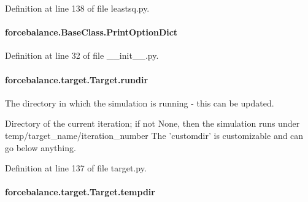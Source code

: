 Definition at line 138 of file leastsq.\-py.

\hypertarget{classforcebalance_1_1BaseClass_afc6659278497d7245bc492ecf405ccae}{
\paragraph[{Print\-Option\-Dict}]{\setlength{\rightskip}{0pt plus 5cm}forcebalance.\-Base\-Class.\-Print\-Option\-Dict\hspace{0.3cm}{\ttfamily [inherited]}}}\label{classforcebalance_1_1BaseClass_afc6659278497d7245bc492ecf405ccae}


Definition at line 32 of file \-\_\-\-\_\-init\-\_\-\-\_\-.\-py.

\hypertarget{classforcebalance_1_1target_1_1Target_a6872de5b2d4273b82336ea5b0da29c9e}{
\paragraph[{rundir}]{\setlength{\rightskip}{0pt plus 5cm}forcebalance.\-target.\-Target.\-rundir\hspace{0.3cm}{\ttfamily [inherited]}}}\label{classforcebalance_1_1target_1_1Target_a6872de5b2d4273b82336ea5b0da29c9e}


The directory in which the simulation is running -\/ this can be updated. 

Directory of the current iteration; if not None, then the simulation runs under temp/target\-\_\-name/iteration\-\_\-number The 'customdir' is customizable and can go below anything.

Definition at line 137 of file target.\-py.

\hypertarget{classforcebalance_1_1target_1_1Target_aa1f01b5b78db253b5b66384ed11ed193}{
\paragraph[{tempdir}]{\setlength{\rightskip}{0pt plus 5cm}forcebalance.\-target.\-Target.\-tempdir\hspace{0.3cm}{\ttfamily [inherited]}}}\label{classforcebalance_1_1target_1_1Target_aa1f01b5b78db253b5b66384ed11ed193}


